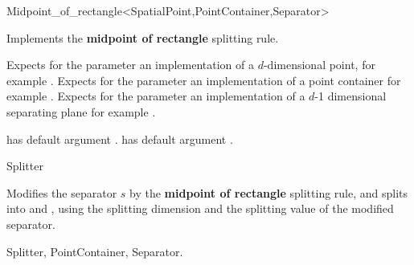 

\begin{ccRefFunctionObjectClass}{Midpoint_of_rectangle<SpatialPoint,PointContainer,Separator>}  %


\ccDefinition
Implements the {\bf midpoint of rectangle} splitting rule.

\ccParameters

Expects for the parameter  an implementation of a $d$-dimensional point,
for example . Expects for the parameter  an implementation
of a point container for example .
Expects for the parameter  an implementation of a $d$-1 dimensional 
separating plane for example .

 has default argument .
 has default argument . 



\ccIsModel

Splitter

\ccTypes



\ccOperations

{Modifies the separator $s$ by the {\bf midpoint of rectangle} splitting rule, 
and splits  into  and ,
using the splitting dimension and the splitting value of the modified separator.
}

\ccSeeAlso

Splitter, PointContainer, Separator.
\end{ccRefFunctionObjectClass}




